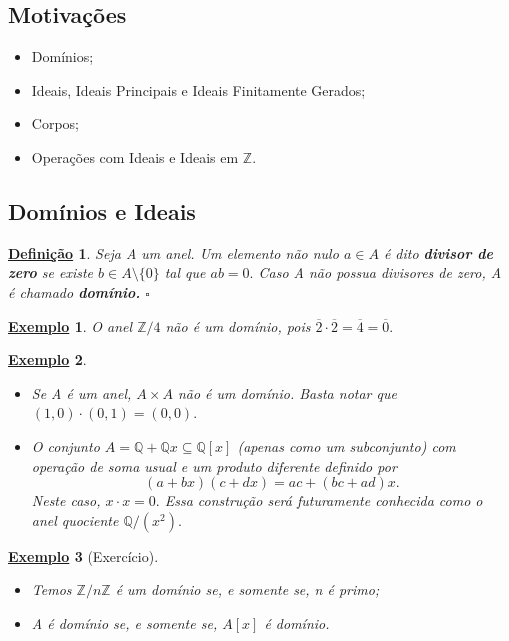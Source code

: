 \documentclass{article}
\newtheorem*{def*}{\underline{Defini\c c\~ao}}
\newtheorem{example}{\underline{Exemplo}}
\begin{document}
\subsection{Motivações}
\begin{itemize}
  \item Domínios;
  \item Ideais, Ideais Principais e Ideais Finitamente Gerados;
  \item Corpos;
  \item Operações com Ideais e Ideais em \(\mathbb{Z}\).
\end{itemize}
\subsection{Domínios e Ideais}
\begin{def*}
  Seja A um anel. Um elemento não nulo \(a\in A\) é dito \textbf{divisor de zero} se existe \(b\in A\setminus{\{0\}}\) tal que
 \(ab = 0.\) Caso A não possua divisores de zero, A é chamado \textbf{domínio.} \(\square\)
\end{def*}
\begin{example}
  O anel \(\mathbb{Z}/4\) não é um domínio, pois \(\overline{2}\cdot \overline{2} = \overline{4} = \overline{0}.\)
\end{example}
\begin{example}
 \begin{itemize}
  \item[1)] Se A é um anel, \(A\times A\) não é um domínio. Basta notar que \((1, 0)\cdot (0, 1) = (0, 0).\)
  \item[2)] O conjunto \(A = \mathbb{Q} + \mathbb{Q}x \subseteq{\mathbb{Q}[x]}\) (apenas como um subconjunto) com operação de soma usual e um
produto diferente definido por 
  \[
    (a+bx)(c+dx) = ac + (bc+ad)x.
  \]
  Neste caso, \(x \cdot x = 0.\) Essa construção será futuramente conhecida como o anel quociente \(\mathbb{Q}/(x^{2}).\)
 \end{itemize}
\end{example}
\begin{example}[Exercício]
 \begin{itemize}
  \item[1)] Temos \(\mathbb{Z}/n \mathbb{Z}\) é um domínio se, e somente se, n é primo;
  \item[2)] A é domínio se, e somente se, \(A[x]\) é domínio.
 \end{itemize}
\end{example}
\end{document}
